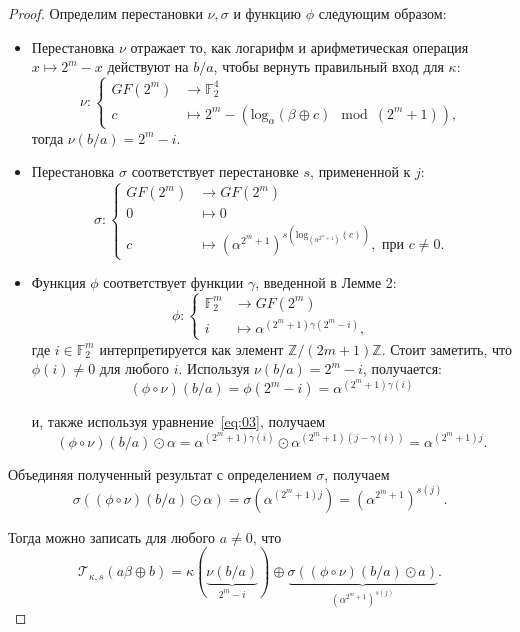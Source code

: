\begin{proof}
Определим перестановки \(\nu, \sigma\) и функцию \(\phi\) следующим образом:

\begin{itemize}
  \item Перестановка \(\nu\) отражает то, как логарифм и арифметическая операция \(x \mapsto 2^m - x\) действуют на \(b/a\), чтобы вернуть правильный вход для \(\kappa\):
  \[
  \nu :
  \begin{cases}
  GF(2^m) & \to \mathbb{F}^4_2 \\
  c & \mapsto 2^m - (\mathrm{log}_{\alpha}(\beta \oplus c) \mod (2^m + 1)),
  \end{cases}
  \]
  тогда \(\nu(b/a) = 2^m - i\).

  \item Перестановка \(\sigma\) соответствует перестановке \(s\), примененной к \(j\):
  \[
  \sigma :
  \begin{cases}
  GF(2^m) & \to GF(2^m) \\
  0 & \mapsto 0 \\
  c & \mapsto (\alpha^{2^m+1})^{s(\mathrm{log}_{(\alpha^{2^m+1})}(c))}, \text{ при } c \neq 0.
  \end{cases}
  \]

  \item Функция \(\phi\) соответствует функции \(\gamma\), введенной в Лемме 2:
  \[
  \phi :
  \begin{cases}
  \mathbb{F}^m_2 & \to GF(2^m) \\
  i & \mapsto \alpha^{(2^m+1)\gamma(2^m-i)},
  \end{cases}
  \]
  где \(i \in \mathbb{F}^m_2\) интерпретируется как элемент \(\mathbb{Z}/(2m + 1)\mathbb{Z}\). Стоит заметить, что \(\phi(i) \neq 0\) для любого \(i\). Используя \(\nu(b/a) = 2^m - i\), получается:
  \[
  (\phi \circ \nu)(b/a) = \phi(2^m - i) = \alpha^{(2^m+1)\gamma(i)}
  \]

  и, также используя уравнение~\ref{eq:03}, получаем
  \[
  (\phi \circ \nu)(b/a) \odot \alpha = \alpha^{(2^m+1)\gamma(i)} \odot \alpha^{(2^m+1)(j-\gamma(i))} = \alpha^{(2^m+1)j}.
  \]
\end{itemize}

  Объединяя полученный результат с определением \(\sigma\), получаем
  \[
  \sigma((\phi \circ \nu)(b/a) \odot \alpha) = \sigma(\alpha^{(2^m+1)j}) = (\alpha^{2^m+1})^{s(j)}.
  \]

Тогда можно записать для любого \(a \neq 0\), что
\[
  \mathscr{T}_{\kappa, s}(a \beta \oplus b)=\kappa(\underbrace{\nu(b / a)}_{2^m-i}) \oplus \underbrace{\sigma((\phi \circ \nu)(b / a) \odot a)}_{\left(\alpha^{2^m+1}\right)^{s(j)}} .
\]


\end{proof}
